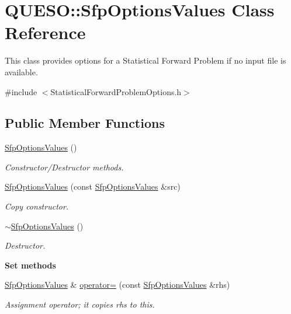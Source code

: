 \hypertarget{class_q_u_e_s_o_1_1_sfp_options_values}{\section{Q\-U\-E\-S\-O\-:\-:Sfp\-Options\-Values Class Reference}
\label{class_q_u_e_s_o_1_1_sfp_options_values}
}


This class provides options for a Statistical Forward Problem if no input file is available.  




{\ttfamily \#include $<$Statistical\-Forward\-Problem\-Options.\-h$>$}

\subsection*{Public Member Functions}
{\bf }\par
\begin{DoxyCompactItemize}
\item 
\hyperlink{class_q_u_e_s_o_1_1_sfp_options_values_a4d22c8810ddcb0cbcadf2d1ebef94017}{Sfp\-Options\-Values} ()
\begin{DoxyCompactList}\small\item\em Constructor/\-Destructor methods. \end{DoxyCompactList}\item 
\hyperlink{class_q_u_e_s_o_1_1_sfp_options_values_a00a1957ae1fc524b93d7ec0f5625ca66}{Sfp\-Options\-Values} (const \hyperlink{class_q_u_e_s_o_1_1_sfp_options_values}{Sfp\-Options\-Values} \&src)
\begin{DoxyCompactList}\small\item\em Copy constructor. \end{DoxyCompactList}\item 
\hyperlink{class_q_u_e_s_o_1_1_sfp_options_values_adaf1b4661c41fc88ff406eb252414ed7}{$\sim$\-Sfp\-Options\-Values} ()
\begin{DoxyCompactList}\small\item\em Destructor. \end{DoxyCompactList}\end{DoxyCompactItemize}

\begin{Indent}{\bf Set methods}\par
\begin{DoxyCompactItemize}
\item 
\hyperlink{class_q_u_e_s_o_1_1_sfp_options_values}{Sfp\-Options\-Values} \& \hyperlink{class_q_u_e_s_o_1_1_sfp_options_values_add6fb5c02575aa3828f727835d84da6a}{operator=} (const \hyperlink{class_q_u_e_s_o_1_1_sfp_options_values}{Sfp\-Options\-Values} \&rhs)
\begin{DoxyCompactList}\small\item\em Assignment operator; it copies {\ttfamily rhs} to {\ttfamily this}. \end{DoxyCompactList}\end{DoxyCompactItemize}
\end{Indent}
